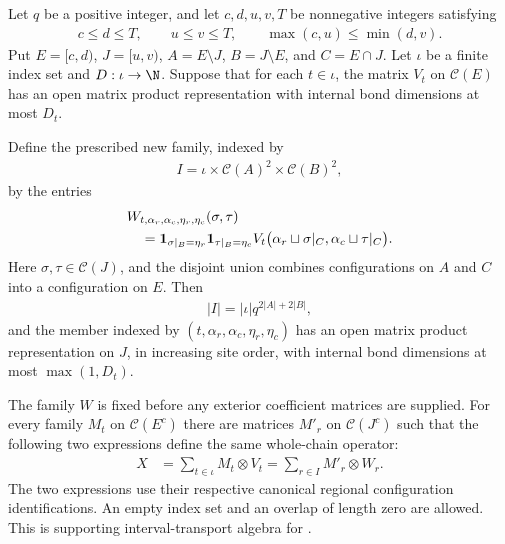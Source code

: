 \begin{lemma}
    \label{thm:interval_mpo_common_family_transfer}
    \leanok
    Let $q$ be a positive integer, and let $c,d,u,v,T$ be nonnegative
    integers satisfying
    \begin{align}
        c\le d\le T,\qquad u\le v\le T,\qquad
        \max(c,u)\le\min(d,v).
        \label{eq:interval_mpo_transfer_endpoints}
    \end{align}
    Put $E={[c,d)}$,
    $J={[u,v)}$, $A=E\setminus J$, $B=J\setminus E$, and
    $C=E\cap J$. Let $\iota$ be a finite index set and $D:\iota\to\N$.
    Suppose that for each
    $t\in\iota$, the matrix $V_t$ on $\mathcal C(E)$ has an open matrix
    product representation with internal bond dimensions at most $D_t$.

    Define the prescribed new family, indexed by
    \begin{align}
        I=\iota\times\mathcal C(A)^2\times\mathcal C(B)^2,
        \label{eq:interval_mpo_transfer_index}
    \end{align}
    by the entries
    \begin{align}
         & W_{t,\alpha_r,\alpha_c,\eta_r,\eta_c}(\sigma,\tau)\notag   \\
         & \quad=\mathbf1_{\sigma|_B=\eta_r}\mathbf1_{\tau|_B=\eta_c}
        V_t\bigl(\alpha_r\sqcup\sigma|_C,
        \alpha_c\sqcup\tau|_C\bigr).
        \label{eq:interval_mpo_transfer_factor}
    \end{align}
    Here $\sigma,\tau\in\mathcal C(J)$, and the disjoint union combines
    configurations on $A$ and $C$ into a configuration on $E$.
    Then
    \begin{align}
        |I|=|\iota|q^{2|A|+2|B|},
        \label{eq:interval_mpo_transfer_count}
    \end{align}
    and the member indexed by $(t,\alpha_r,\alpha_c,\eta_r,\eta_c)$ has an
    open matrix product representation on $J$, in increasing site order,
    with internal bond dimensions at most $\max(1,D_t)$.

    The family $W$ is fixed before any exterior coefficient matrices are
    supplied. For every family $M_t$ on $\mathcal C(E^c)$ there are
    matrices $M'_r$ on $\mathcal C(J^c)$ such that the following two
    expressions define the same whole-chain operator:
    \begin{align}
        X & =\sum_{t\in\iota}M_t\otimes V_t
        =\sum_{r\in I}M'_r\otimes W_r.
        \label{eq:interval_mpo_transfer_decomposition}
    \end{align}
    The two expressions use their respective canonical regional
    configuration identifications. An empty index set and an overlap of
    length zero are allowed.
    This is supporting interval-transport algebra for
    \cite[Proposition~5.7]{Arad2016RigorousRG}.
\end{lemma}
